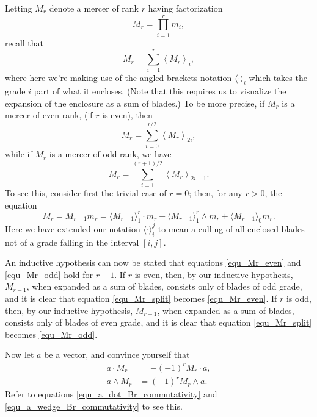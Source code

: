 \documentclass{birkjour}
\theoremstyle{definition}
\theoremstyle{remark}
\numberwithin{equation}{section}
\begin{document}
Letting $M_r$ denote a mercer of rank $r$ having factorization
\begin{equation}\label{equ_M_r}
M_r = \prod_{i=1}^r m_i,
\end{equation}
recall that
\begin{equation*}
M_r = \sum_{i=1}^r\left\langle M_r\right\rangle_i,
\end{equation*}
where here we're making use of the angled-brackets notation $\langle\cdot\rangle_i$ which takes the grade $i$ part of
what it encloses.  (Note that this requires us to visualize the expansion of the enclosure as a sum of blades.)  To be more precise,
if $M_r$ is a mercer of even rank, (if $r$ is even), then
\begin{equation}\label{equ_Mr_even}
M_r = \sum_{i=0}^{r/2}\left\langle M_r\right\rangle_{2i},
\end{equation}
while if $M_r$ is a mercer of odd rank, we have
\begin{equation}\label{equ_Mr_odd}
M_r = \sum_{i=1}^{(r+1)/2}\left\langle M_r\right\rangle_{2i-1}.
\end{equation}
To see this, consider first the trivial case of $r=0$; then, for any $r>0$, the equation
\begin{equation}\label{equ_Mr_split}
M_r = M_{r-1}m_r = \langle M_{r-1}\rangle_1^r\cdot m_r + \langle M_{r-1}\rangle_1^r\wedge m_r + \langle M_{r-1}\rangle_0 m_r.
\end{equation}
Here we have extended our notation $\langle\cdot\rangle_i^j$ to mean a culling of all enclosed blades not of a grade falling
in the interval $[i,j]$.

An inductive hypothesis can now be stated that equations \eqref{equ_Mr_even} and \eqref{equ_Mr_odd} hold for $r-1$.
If $r$ is even, then, by our inductive hypothesis, $M_{r-1}$, when expanded as a sum of blades, consists only of blades of odd grade,
and it is clear that equation \eqref{equ_Mr_split} becomes \eqref{equ_Mr_even}.  If $r$ is odd, then, by our inductive hypothesis, $M_{r-1}$, when expanded as
a sum of blades, consists only of blades of even grade, and it is clear that equation \eqref{equ_Mr_split} becomes \eqref{equ_Mr_odd}.

Now let $a$ be a vector, and convince yourself that
\begin{align}
a\cdot M_r &= -(-1)^r M_r\cdot a,\label{equ_a_dot_Mr_commutativity} \\
a\wedge M_r &= (-1)^r M_r\wedge a.\label{equ_a_wedge_Mr_commutativity}
\end{align}
Refer to equations \eqref{equ_a_dot_Br_commutativity} and \eqref{equ_a_wedge_Br_commutativity} to see this.
\end{document}
